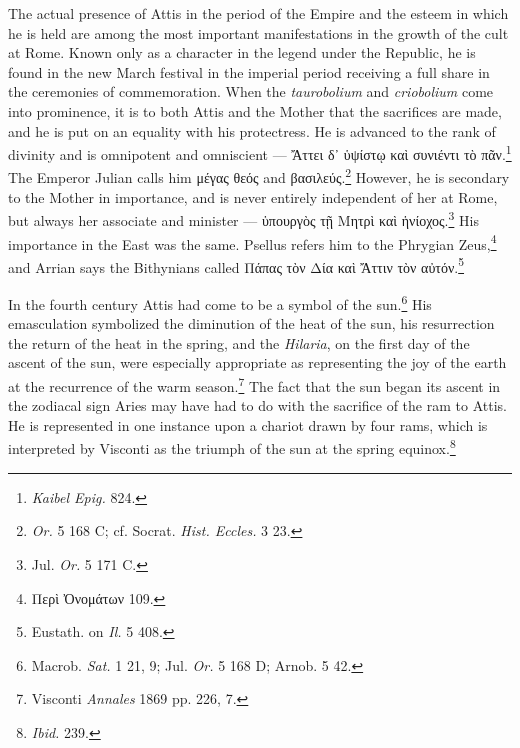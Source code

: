 \documentclass[a4paper, 11pt, oneside, polutonikogreek, english]{article}
\begin{document}
The actual presence of Attis in the period of the Empire and the esteem in which he is held are among the most important manifestations in the growth of the cult at Rome. Known only as a character in the legend under the Republic, he is found in the new March festival in the imperial period receiving a full share in the ceremonies of commemoration. When the \emph{taurobolium} and \emph{criobolium} come into prominence, it is to both Attis and the Mother that the sacrifices are made, and he is put on an equality with his protectress. He is advanced to the rank of divinity and is omnipotent and omniscient --- Ἄττει δ᾽ ὑψίστῳ καὶ συνιέντι τὸ πᾶν.\footnote{\emph{Kaibel Epig.} 824.} The Emperor Julian calls him μέγας θεός and βασιλεύς.\footnote{\emph{Or.} 5 168 C; cf. Socrat. \emph{Hist. Eccles.} 3 23.} However, he is secondary to the Mother in importance, and is never entirely independent of her at Rome, but always her associate and minister --- ὑπουργὸς τῇ Μητρὶ καὶ ἡνίοχος.\footnote{Jul. \emph{Or.} 5 171 C.} His importance in the East was the same. Psellus refers him to the Phrygian Zeus,\footnote{Περὶ Ὀνομάτων 109.} and Arrian says the Bithynians called Πάπας τὸν Δία καὶ Ἄττιν τὸν αὐτόν.\footnote{Eustath. on \emph{Il.} 5 408.}

In the fourth century Attis had come to be a symbol of the sun.\footnote{Macrob. \emph{Sat.} 1 21, 9; Jul. \emph{Or.} 5 168 D; Arnob. 5 42.} His emasculation symbolized the diminution of the heat of the sun, his resurrection the return of the heat in the spring, and the \emph{Hilaria}, on the first day of the ascent of the sun, were especially appropriate as representing the joy of the earth at the recurrence of the warm season.\footnote{Visconti \emph{Annales} 1869 pp. 226, 7.} The fact that the sun began its ascent in the zodiacal sign Aries may have had to do with the sacrifice of the ram to Attis. He is represented in one instance upon a chariot drawn by four rams, which is interpreted by Visconti as the triumph of the sun at the spring equinox.\footnote{\emph{Ibid.} 239.}
\end{document}
